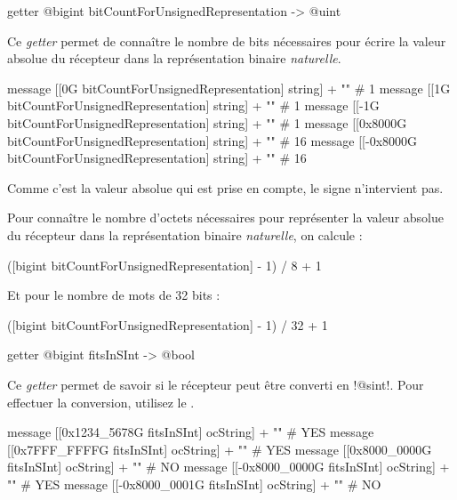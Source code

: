 
\begin{galgas}
getter @bigint bitCountForUnsignedRepresentation -> @uint
\end{galgas}

Ce \emph{getter} permet de connaître le nombre de bits nécessaires pour écrire la valeur absolue du récepteur dans la représentation binaire \emph{naturelle}. 

\begin{galgas}
message [[0G bitCountForUnsignedRepresentation] string] + "\n" # 1
message [[1G bitCountForUnsignedRepresentation] string] + "\n" # 1
message [[-1G bitCountForUnsignedRepresentation] string] + "\n" # 1
message [[0x8000G bitCountForUnsignedRepresentation] string] + "\n" # 16
message [[-0x8000G bitCountForUnsignedRepresentation] string] + "\n" # 16
\end{galgas}

Comme c'est la valeur absolue qui est prise en compte, le signe n'intervient pas.

Pour connaître le nombre d'octets nécessaires pour représenter la valeur absolue du récepteur dans la représentation binaire \emph{naturelle}, on calcule :
\begin{galgas}
([bigint bitCountForUnsignedRepresentation] - 1) / 8 + 1 
\end{galgas}

Et pour le nombre de mots de 32 bits :
\begin{galgas}
([bigint bitCountForUnsignedRepresentation] - 1) / 32 + 1 
\end{galgas}


\begin{galgas}
getter @bigint fitsInSInt -> @bool
\end{galgas}

Ce \emph{getter} permet de savoir si le récepteur peut être converti en \ggs!@sint!. Pour effectuer la conversion, utilisez le .

\begin{galgas}
message [[0x1234_5678G fitsInSInt] ocString] + "\n" # YES
message [[0x7FFF_FFFFG fitsInSInt] ocString] + "\n" # YES
message [[0x8000_0000G fitsInSInt] ocString] + "\n" # NO
message [[-0x8000_0000G fitsInSInt] ocString] + "\n" # YES
message [[-0x8000_0001G fitsInSInt] ocString] + "\n" # NO
\end{galgas}




